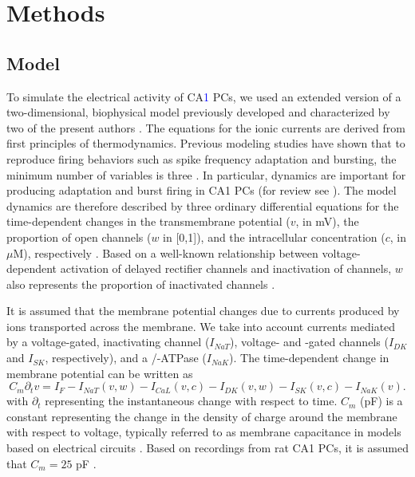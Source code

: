 \documentclass[12pt]{article}
\newcommand{\edit}[1]{\textcolor{blue}{#1}}
\begin{document}
\section{Methods}

\subsection{Model}
To simulate the electrical activity of CA\edit{1} PCs, we used an extended version of a two-dimensional, biophysical model previously developed and characterized by two of the present authors  \cite{herrera2012membranes,herrera2013relating,herrera2018thermodynamic}. The equations for the ionic currents are derived from first principles of thermodynamics. Previous modeling studies have shown that to reproduce firing behaviors such as spike frequency adaptation and bursting, the minimum number of variables is three \cite{hindmarsh1984model,avron1993basic}. 
In particular, {\Ca} dynamics are important for producing adaptation and burst firing in CA1 PCs (for review see \cite{mckiernan2017ca1}). 
The model dynamics are therefore described by three ordinary differential equations for the time-dependent changes in the transmembrane potential ($v$, in mV), the proportion of open {\K} channels ($w$ in [0,1]), and the intracellular {\Ca} concentration ($c$, in $\mu$M), respectively   \citep{herrera2018thermodynamic}. Based on a well-known relationship between voltage-dependent activation of delayed rectifier {\K} channels and inactivation of {\Na} channels, $w$ also represents the proportion of inactivated {\Na} channels \cite{rinzel1985excitation,avron1991minimal}.

It is assumed that the membrane potential changes due to currents produced by ions transported across the membrane. We take into account currents mediated by a voltage-gated, inactivating {\Na} channel ($I_{NaT}$), voltage- and {\Ca}-gated \K channels ($I_{DK}$ and $I_{SK}$, respectively), and a {\Na}/{\K}-ATPase ($I_{NaK}$). The time-dependent change in membrane potential can be written as
\begin{equation}
C_m \partial_t v= I_{F} - I_{NaT}(v,w) - I_{CaL}(v,c) - I_{DK}(v,w) - I_{SK}(v,c) - I_{NaK}(v). \label{eq:dvdt}
\end{equation}
with $\partial_t$ representing the instantaneous change with respect to time. $C_m$ (pF) is a constant representing the change in the density of charge around the membrane with respect to voltage, typically referred to as membrane capacitance in models based on electrical circuits  \cite{herrera2020nonequivalent}. Based on recordings from rat CA1 PCs, it is  assumed that $C_m=25$  pF \cite{groc2002vivo}.
\end{document}

